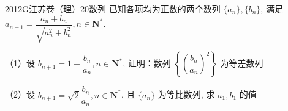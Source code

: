 
\begin{problem}{2012}{G}{江苏卷（理）}{20}{数列}
已知各项均为正数的两个数列 $\{a_n\}, \{b_n\}$, 满足 $a_{n+1} = \dfrac{a_n+b_n}{\sqrt{a_n^2+b_n^2}}, n \in \mathbf{N}^*$.

（1）设 $b_{n+1} = 1 + \dfrac{b_n}{a_n}, n \in \mathbf{N}^*$, 证明：数列 $\left\{\left(\dfrac{b_n}{a_n}\right)^2\right\}$ 为等差数列

（2）设 $b_{n+1} = \sqrt{2}\dfrac{b_n}{a_n}, n \in \mathbf{N}^*$, 且 $\{a_n\}$ 为等比数列, 求 $a_1, b_1$ 的值
\end{problem}